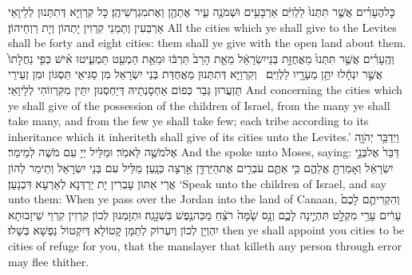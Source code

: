 {כׇּל\maqqaf הֶעָרִ֗ים אֲשֶׁ֤ר תִּתְּנוּ֙ לַלְוִיִּ֔ם אַרְבָּעִ֥ים וּשְׁמֹנֶ֖ה עִ֑יר אֶתְהֶ֖ן וְאֶת\maqqaf מִגְרְשֵׁיהֶֽן׃}
{כָּל קִרְוַיָּא דְּתִתְּנוּן לְלֵיוָאֵי אַרְבְּעִין וְתַמְנֵי קִרְוִין יָתְהוֹן וְיָת רַוְחֵיהוֹן׃}
{All the cities which ye shall give to the Levites shall be forty and eight cities: them shall ye give with the open land about them.}{}
{וְהֶֽעָרִ֗ים אֲשֶׁ֤ר תִּתְּנוּ֙ מֵאֲחֻזַּ֣ת בְּנֵי\maqqaf יִשְׂרָאֵ֔ל מֵאֵ֤ת הָרַב֙ תַּרְבּ֔וּ וּמֵאֵ֥ת הַמְעַ֖ט תַּמְעִ֑יטוּ אִ֗ישׁ כְּפִ֤י נַחֲלָתוֹ֙ אֲשֶׁ֣ר יִנְחָ֔לוּ יִתֵּ֥ן מֵעָרָ֖יו לַלְוִיִּֽם׃ \petucha }
{וְקִרְוַיָּא דְּתִתְּנוּן מֵאֲחֻדַּת בְּנֵי יִשְׂרָאֵל מִן סַגִּיאֵי תַּסְגּוֹן וּמִן זְעֵירֵי תַּזְעֲרוּן גְּבַר כְּפוֹם אַחְסָנְתֵיהּ דְּיַחְסְנוּן יִתֵּין מִקִּרְווֹהִי לְלֵיוָאֵי׃}
{And concerning the cities which ye shall give of the possession of the children of Israel, from the many ye shall take many, and from the few ye shall take few; each tribe according to its inheritance which it inheriteth shall give of its cities unto the Levites.’}{}
{וַיְדַבֵּ֥ר יְהֹוָ֖ה אֶל\maqqaf מֹשֶׁ֥ה לֵּאמֹֽר׃}
{וּמַלֵּיל יְיָ עִם מֹשֶׁה לְמֵימַר׃}
{And the \lord\space spoke unto Moses, saying:}{}
{דַּבֵּר֙ אֶל\maqqaf בְּנֵ֣י יִשְׂרָאֵ֔ל וְאָמַרְתָּ֖ אֲלֵהֶ֑ם כִּ֥י אַתֶּ֛ם עֹבְרִ֥ים אֶת\maqqaf הַיַּרְדֵּ֖ן אַ֥רְצָה כְּנָֽעַן׃}
{מַלֵּיל עִם בְּנֵי יִשְׂרָאֵל וְתֵימַר לְהוֹן אֲרֵי אַתּוּן עָבְרִין יָת יַרְדְּנָא לְאַרְעָא דִּכְנָעַן׃}
{‘Speak unto the children of Israel, and say unto them: When ye pass over the Jordan into the land of Canaan,}{}
{וְהִקְרִיתֶ֤ם לָכֶם֙ עָרִ֔ים עָרֵ֥י מִקְלָ֖ט תִּהְיֶ֣ינָה לָכֶ֑ם וְנָ֥ס שָׁ֙מָּה֙ רֹצֵ֔חַ מַכֵּה\maqqaf נֶ֖פֶשׁ בִּשְׁגָגָֽה׃}
{וּתְזָמְנוּן לְכוֹן קִרְוִין קִרְוֵי שֵׁיזָבוּתָא יִהְוְיָן לְכוֹן וְיִעְרוֹק לְתַמָּן קָטוֹלָא דְּיִקְטוֹל נַפְשָׁא בְּשָׁלוּ׃}
{then ye shall appoint you cities to be cities of refuge for you, that the manslayer that killeth any person through error may flee thither.}{}
